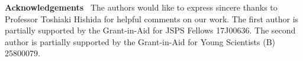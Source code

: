 \documentclass[11pt,a4paper]{article}
\begin{document}
































































\noindent 
{\bf Acknowledgements} \, The authors would like to express sincere thanks to Professor Toshiaki Hishida for helpful comments on our work. The first author is partially supported by the Grant-in-Aid for JSPS Fellows 17J00636. The second author is partially supported by the Grant-in-Aid for Young Scientists (B) 25800079. 
\end{document}
